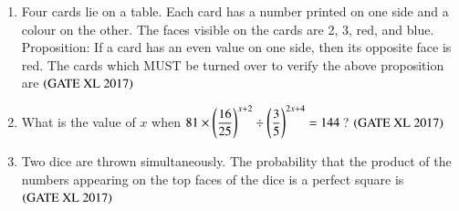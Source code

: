 \documentclass[journal]{IEEEtran}
\begin{document}
\begin{enumerate}
\item Four cards lie on a table. Each card has a number printed on one side and a colour on the other. The faces visible on the cards are 2, 3, red, and blue. Proposition: If a card has an even value on one side, then its opposite face is red. The cards which MUST be turned over to verify the above proposition are \hfill $\left(\text{GATE XL 2017}\right)$
\begin{enumerate}
\end{enumerate}

\item What is the value of $x$ when $81\times\left(\dfrac{16}{25}\right)^{x+2}\div\left(\dfrac{3}{5}\right)^{2x+4}=144\,$? \hfill $\left(\text{GATE XL 2017}\right)$
\begin{enumerate}
\end{enumerate}

\item Two dice are thrown simultaneously. The probability that the product of the numbers appearing on the top faces of the dice is a perfect square is \hfill $\left(\text{GATE XL 2017}\right)$
\begin{enumerate}
\end{enumerate}


\end{enumerate}
\end{document}
